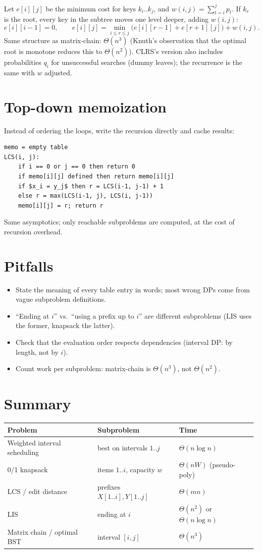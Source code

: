 Let $e[i][j]$ be the minimum cost for keys $k_i..k_j$, and $w(i,j)=\sum_{t=i}^jp_t$. If $k_r$ is the root, every key in the subtree
moves one level deeper, adding $w(i,j)$:
\[
e[i][i-1]=0,\qquad e[i][j]=\min_{i\le r\le j}\bigl(e[i][r-1]+e[r+1][j]\bigr)+w(i,j).
\]
Same structure as matrix-chain: $\Theta(n^3)$ (Knuth's observation that the optimal root is monotone reduces this to $\Theta(n^2)$).
CLRS's version also includes probabilities $q_i$ for unsuccessful searches (dummy leaves); the recurrence is the same with $w$ adjusted.

\section{Top-down memoization}
Instead of ordering the loops, write the recursion directly and cache results:
\begin{lstlisting}[style=pseudo]
memo = empty table
LCS(i, j):
    if i == 0 or j == 0 then return 0
    if memo[i][j] defined then return memo[i][j]
    if $x_i = y_j$ then r = LCS(i-1, j-1) + 1
    else r = max(LCS(i-1, j), LCS(i, j-1))
    memo[i][j] = r; return r
\end{lstlisting}
Same asymptotics; only reachable subproblems are computed, at the cost of recursion overhead.

\section{Pitfalls}
\begin{itemize}
  \item State the meaning of every table entry in words; most wrong DPs come from vague subproblem definitions.
  \item ``Ending at $i$'' vs.\ ``using a prefix up to $i$'' are different subproblems (LIS uses the former, knapsack the latter).
  \item Check that the evaluation order respects dependencies (interval DP: by length, not by $i$).
  \item Count work per subproblem: matrix-chain is $\Theta(n^3)$, not $\Theta(n^2)$.
\end{itemize}

\section*{Summary}
\begin{center}
\begin{tabular}{lll}
\toprule
Problem & Subproblem & Time \\
\midrule
Weighted interval scheduling & best on intervals $1..j$ & $\Theta(n\log n)$ \\
0/1 knapsack & items $1..i$, capacity $w$ & $\Theta(nW)$ (pseudo-poly) \\
LCS / edit distance & prefixes $X[1..i],Y[1..j]$ & $\Theta(mn)$ \\
LIS & ending at $i$ & $\Theta(n^2)$ or $\Theta(n\log n)$ \\
Matrix chain / optimal BST & interval $[i,j]$ & $\Theta(n^3)$ \\
\bottomrule
\end{tabular}
\end{center}
